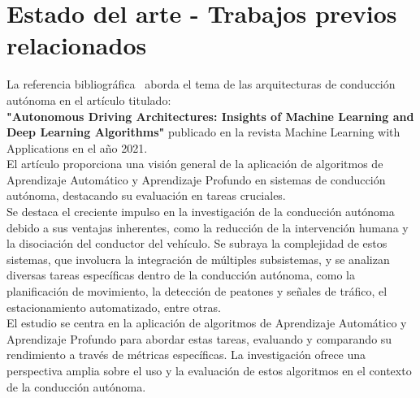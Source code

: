 \documentclass[10pt,letterpaper,final]{article}
\begin{document}
    \section*{Estado del arte - Trabajos previos relacionados}
    \newline
    \begin{longtable}
        \hline
        \newline
        \noindent La referencia bibliográfica~\cite{bachute2021autonomous} aborda el tema de las arquitecturas de conducción autónoma
        en el artículo titulado:                                                                                                          \\ \textbf{"Autonomous Driving Architectures: Insights of Machine Learning and Deep Learning Algorithms"}
        publicado en la revista Machine Learning with Applications en el año 2021.                                                        \\
        El artículo proporciona una visión general de la aplicación de algoritmos de Aprendizaje Automático y Aprendizaje Profundo
        en sistemas de conducción autónoma, destacando su evaluación en tareas cruciales. \\
        Se destaca el creciente impulso en la investigación de la conducción autónoma debido a sus ventajas inherentes, como la reducción
        de la intervención humana y la disociación del conductor del vehículo. Se subraya la complejidad de estos sistemas,
        que involucra la integración de múltiples subsistemas, y se analizan diversas tareas específicas dentro de la conducción autónoma,
        como la planificación de movimiento, la detección de peatones y señales de tráfico, el estacionamiento automatizado, entre otras.\\
        El estudio se centra en la aplicación de algoritmos de Aprendizaje Automático y Aprendizaje Profundo para abordar estas tareas,
        evaluando y comparando su rendimiento a través de métricas específicas. La investigación ofrece una perspectiva amplia sobre el uso
        y la evaluación de estos algoritmos en el contexto de la conducción autónoma.
        

\end{longtable}
\end{document}

